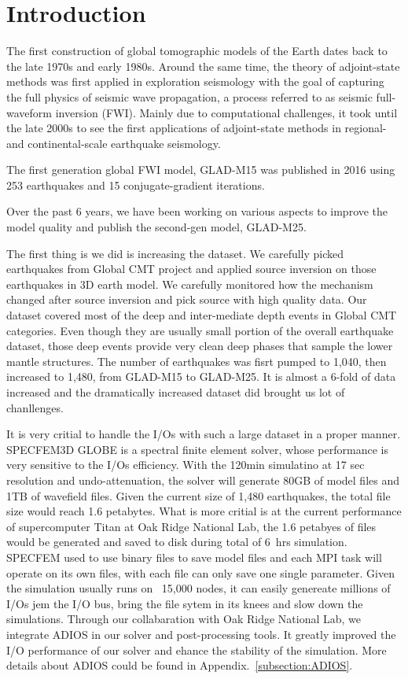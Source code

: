 \chapter{Introduction\label{ch:intro}}

The first construction of global tomographic models of the Earth
dates back to the late 1970s and early 1980s.
Around the same time, the theory of adjoint-state methods was
first applied in exploration seismology with the goal of
capturing the full physics of seismic wave propagation,
a process referred to as seismic full-waveform inversion (FWI).
Mainly due to computational challenges, it took until the late
2000s to see the first applications of adjoint-state methods
in regional- and continental-scale earthquake seismology.

The first generation global FWI model, GLAD-M15\cite{} was published in 2016
using 253 earthquakes and 15 conjugate-gradient iterations.

Over the past 6 years, we have been working on various aspects to improve
the model quality and publish the second-gen model, GLAD-M25.

The first thing is we did is increasing the dataset. We carefully picked
earthquakes from Global CMT project\cite{} and applied source inversion on those
earthquakes in 3D earth model. We carefully monitored how the mechanism changed
after source inversion and pick source with high quality data.
Our dataset covered most of the deep and inter-mediate depth
events in Global CMT categories. Even though they are usually small portion of
the overall earthquake dataset,  those deep events provide very clean deep phases
that sample the lower mantle structures.
The number of earthquakes was fisrt pumped to 1,040, then increased to 1,480,
from GLAD-M15 to GLAD-M25.
It is almost a 6-fold of data increased and the dramatically increased dataset did brought
us lot of chanllenges.

It is very critial to handle the I/Os with such a large dataset in a proper manner. 
SPECFEM3D GLOBE is a spectral finite element solver, whose performance is very
sensitive to the I/Os efficiency. With the 120min simulatino at 17 sec resolution and 
undo-attenuation, the solver will generate 80GB of model files and 1TB of wavefield files.
Given the current size of 1,480 earthquakes, the total file size would reach 1.6 petabytes.
What is more critial is at the current performance of supercomputer Titan at Oak Ridge
National Lab, the 1.6 petabyes of files would be generated and saved to disk during
total of 6~hrs simulation. SPECFEM used to use binary files to save model files and each
MPI task will operate on its own files, with each file can only save one single parameter.
Given the simulation usually runs on ~15,000 nodes, it can easily genereate millions of I/Os
jem the I/O bus, bring the file sytem in its knees and slow down the simulations. Through
our collabaration with Oak Ridge National Lab, we integrate ADIOS in our solver and post-processing
tools. It greatly improved the I/O performance of our solver and ehance the stability of the
simulation. More details about ADIOS could be found in Appendix.~\ref{subsection:ADIOS}.

